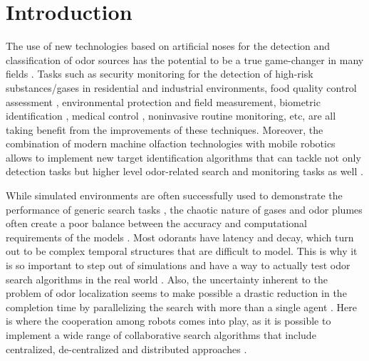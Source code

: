 \chapter{Introduction}
\label{chap:intro}
\vspace{-1cm}



The use of new technologies based on artificial noses for the detection and classification of odor sources has the potential to be a true game-changer in many fields \cite{stitzel2011artificial, wilson2009applications}. Tasks such as security monitoring for the detection of high-risk substances/gases in residential and industrial environments, food quality control assessment \cite{DymerskiChmiel11}, environmental protection and field measurement, biometric identification \cite{RodriguezLujan2013279}, medical control \cite{YanezToledano12}, noninvasive routine monitoring, etc, are all taking benefit from the improvements of these techniques.
Moreover, the combination of modern machine olfaction technologies with mobile robotics allows to implement new target identification algorithms that can tackle not only detection tasks \cite{vazquez2013integracion} but higher level odor-related search and monitoring tasks as well \cite{Hu2013, Marjovi2011, marjovi2010olfactory, song2011olfaction, jatmiko2011robots, Marques2006, Hayes02distributedodor}.

While simulated environments are often successfully used to demonstrate the performance of generic search tasks \cite{Mcgill2011,HayesMG01}, the chaotic nature of gases and odor plumes often create a poor balance between the accuracy and computational requirements of the models \cite{Torney2009}.
Most odorants have latency and decay, which turn out to be complex temporal structures that are difficult to model.
This is why it is so important to step out of simulations and have a way to actually test odor search algorithms in the real world \cite{Hu2013, Marjovi2013, song2011olfaction, HayesMG03}.
Also, the uncertainty inherent to the problem of odor localization seems to make possible a drastic reduction in the completion time by parallelizing the search with more than a single agent \cite{Hu2013, Marjovi2013, Marjovi2011, Hayes02distributedodor, HayesMG01}. Here is where the cooperation among robots comes into play, as it is possible to implement a wide range of collaborative search algorithms that include centralized, de-centralized and distributed approaches \cite{Hu2013, Mcgill2011, marjovi2010olfactory}.


